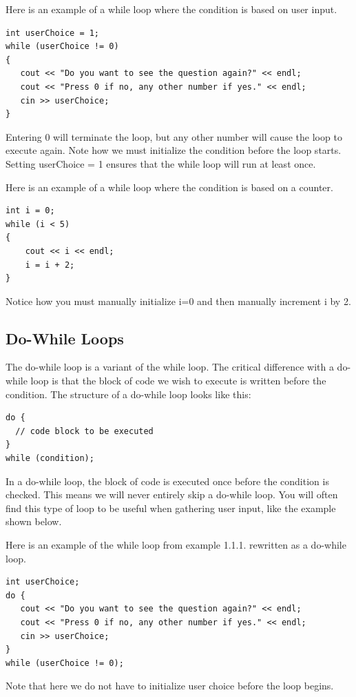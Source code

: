 \begin{example}
Here is an example of a while loop where the condition is based on user input. 
\begin{verbatim}
int userChoice = 1;
while (userChoice != 0)
{
   cout << "Do you want to see the question again?" << endl; 
   cout << "Press 0 if no, any other number if yes." << endl;
   cin >> userChoice;
}
\end{verbatim}
Entering 0 will terminate the loop, but any other number will cause the loop to execute again. Note how we must initialize the condition before the loop starts. Setting userChoice = 1 ensures that the while loop will run at least once.
\end{example}

\begin{example}
    Here is an example of a while loop where the condition is based on a counter.
    \begin{verbatim}
int i = 0; 
while (i < 5)
{
    cout << i << endl;
    i = i + 2;
}
    \end{verbatim}
    Notice how you must manually initialize i=0 and then manually increment i by 2.
\end{example}

\subsection{Do-While Loops}
The do-while loop is a variant of the while loop. The critical difference with a do-while loop is that the block of code we wish to execute is written before the condition. The structure of a do-while loop looks like this:
\begin{verbatim}
do {
  // code block to be executed
}
while (condition);
\end{verbatim}

In a do-while loop, the block of code is executed once before the condition is checked. This means we will never entirely skip a do-while loop. You will often find this type of loop to be useful when gathering user input, like the example shown below.

\begin{example}
    Here is an example of the while loop from example 1.1.1. rewritten as a do-while loop.

    \begin{verbatim}
int userChoice;
do {
   cout << "Do you want to see the question again?" << endl; 
   cout << "Press 0 if no, any other number if yes." << endl;
   cin >> userChoice;
}  
while (userChoice != 0);
    \end{verbatim}

    Note that here we do not have to initialize user choice before the loop begins.
    
\end{example}


